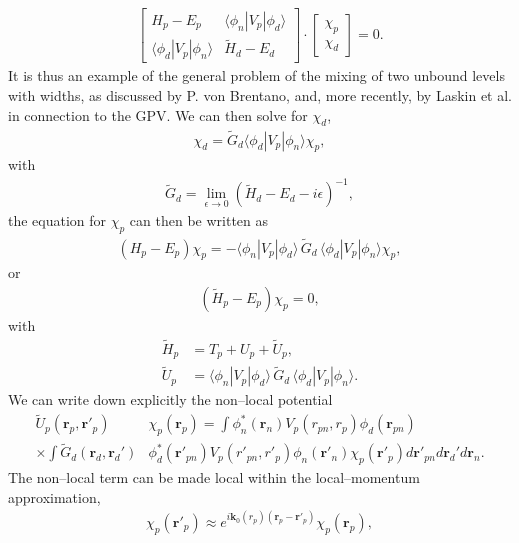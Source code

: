 \documentclass[a4paper,11pt]{article}
\newcommand{\ket}[1]{|{#1} \rangle }
\newcommand{\bra}[1]{\langle {#1}|}
\begin{document}
  \begin{align}\label{eq98}
\left[\begin{matrix}
 H_p-E_p & \bra{\phi_n}V_p\ket{\phi_d} \\ 
 \bra{\phi_d}V_p\ket{\phi_n} & \widetilde H_d-E_d
\end{matrix}\right]\cdot
\left[\begin{matrix}
\chi_p  \\ 
\chi_d
\end{matrix}\right]=0.
  \end{align}  
  It is thus an example of the general problem of the mixing of two unbound levels with widths, as discussed by P. von Brentano, and, more recently, by Laskin et al. in connection to the GPV.
  We can then solve for $\chi_d$,
   \begin{align}\label{eq65}
\chi_d=\widetilde G_d\bra{\phi_d}V_p\ket{\phi_n}\chi_p,
   \end{align} 
   with
      \begin{align}\label{eq66}
\widetilde G_d=\lim_{\epsilon\rightarrow 0}(\widetilde H_d-E_d-i\epsilon)^{-1},
      \end{align} 
the equation for $\chi_p$ can then be written as
      \begin{align}\label{eq67}
(H_p-E_p)\chi_p=-\bra{\phi_n}V_p\ket{\phi_d}\,\widetilde G_d\,\bra{\phi_d}V_p\ket{\phi_n}\chi_p,
      \end{align}
or
\begin{align}\label{eq68}
(\widetilde H_p-E_p)\chi_p=0,
\end{align}      
with
\begin{align}\label{eq69}
\nonumber \widetilde H_p&=T_p+U_p+\widetilde U_p,\\
\widetilde U_p&=\bra{\phi_n}V_p\ket{\phi_d}\,\tilde G_d\,\bra{\phi_d}V_p\ket{\phi_n}.
\end{align}  
We can write down explicitly the non--local potential
  \begin{align}\label{eq52}
\nonumber \widetilde U_p(\mathbf r_p,\mathbf r'_p)&\chi_p(\mathbf r_p)
 =   \int  \phi_n^*(\mathbf r_n)V_p(r_{pn},r_p)\phi_d(\mathbf r_{pn})\\
\times \int \widetilde G_d(\mathbf r_d,\mathbf r_d')&\phi_d^*(\mathbf r'_{pn})V_p(r'_{pn},r'_p)\phi_n(\mathbf r'_n)\chi_p(\mathbf r'_p)d\mathbf r'_{pn}d\mathbf r_d'd\mathbf r_n.
 \end{align}
The non--local term can be made local within the local--momentum approximation,
\begin{align}\label{eq28}
\chi_p(\mathbf r'_p)\approx e^{i\mathbf k_0(r_p)(\mathbf r_p-\mathbf r'_p)}\chi_p(\mathbf r_p),
\end{align}
\end{document}
